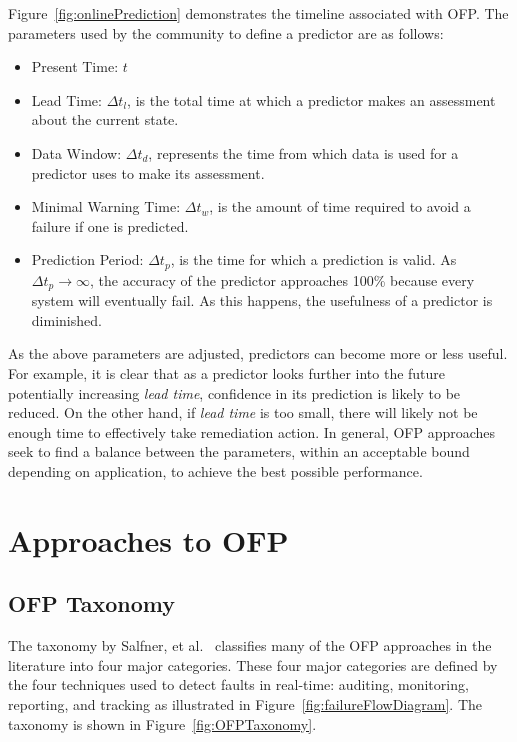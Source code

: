 Figure~\ref{fig:onlinePrediction} demonstrates the timeline associated with
\ac{OFP}.  The parameters used by the community to define a predictor are as
follows:
\begin{itemize}
	\item{Present Time: $t$}
  \item{Lead Time: $\Delta t_{l}$, is the total time at which a predictor makes
  an assessment about the current state.}
  \item{Data Window: $\Delta t_{d}$, represents the time from which data is
  used for a predictor uses to make its assessment.}
  \item{Minimal Warning Time: $\Delta t_{w}$, is the amount of time required to
  avoid a failure if one is predicted.}
  \item{Prediction Period: $\Delta t_{p}$, is the time for which a prediction
  is valid.  As $\Delta t_{p} \rightarrow \infty$, the accuracy of the
  predictor approaches 100\% because every system will eventually fail.  As
  this happens, the usefulness of a predictor is diminished.}
\end{itemize}

As the above parameters are adjusted, predictors can become more or less
useful.  For example, it is clear that as a predictor looks further into the
future potentially increasing \emph{lead time}, confidence in its prediction is
likely to be reduced.  On the other hand, if \emph{lead time} is too small,
there will likely not be enough time to effectively take remediation action.
In general, \ac{OFP} approaches seek to find a balance between the parameters,
within an acceptable bound depending on application, to achieve the best
possible performance.

\section{Approaches to \ac{OFP}} \label{approaches}
\subsection{\ac{OFP} Taxonomy}
The taxonomy by Salfner, et al.~\cite{salfnerSurvey} classifies many of the
\ac{OFP} approaches in the literature into four major categories.  These four
major categories are defined by the four techniques used to detect faults in
real-time: auditing, monitoring, reporting, and tracking as illustrated in
Figure~\ref{fig:failureFlowDiagram}.  The taxonomy is shown in
Figure~\ref{fig:OFPTaxonomy}.


